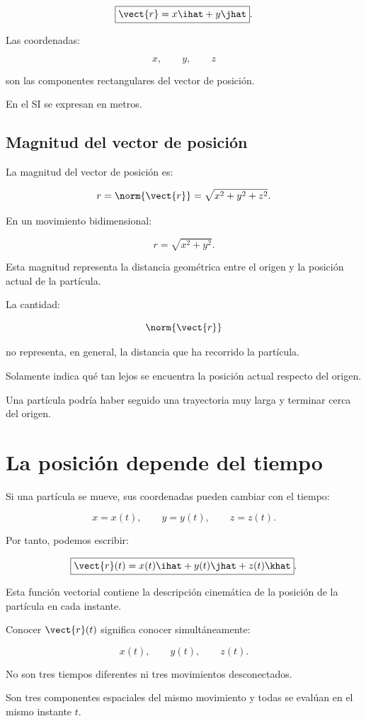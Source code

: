 \[
\boxed{
\vect{r}
=
x\ihat+y\jhat
}.
\]

Las coordenadas:

\[
x,\qquad y,\qquad z
\]

son las componentes rectangulares del vector de posición.

En el SI se expresan en metros.

\subsection{Magnitud del vector de posición}

La magnitud del vector de posición es:

\[
r
=
\norm{\vect{r}}
=
\sqrt{x^2+y^2+z^2}.
\]

En un movimiento bidimensional:

\[
r=\sqrt{x^2+y^2}.
\]

Esta magnitud representa la distancia geométrica entre el origen y la posición
actual de la partícula.

\begin{errorfrecuente}
La cantidad:

\[
\norm{\vect{r}}
\]

no representa, en general, la distancia que ha recorrido la partícula.

Solamente indica qué tan lejos se encuentra la posición actual respecto del
origen.

Una partícula podría haber seguido una trayectoria muy larga y terminar cerca
del origen.
\end{errorfrecuente}


\section{La posición depende del tiempo}

Si una partícula se mueve, sus coordenadas pueden cambiar con el tiempo:

\[
x=x(t),
\qquad
y=y(t),
\qquad
z=z(t).
\]

Por tanto, podemos escribir:

\[
\boxed{
\vect{r}(t)
=
x(t)\ihat+y(t)\jhat+z(t)\khat
}.
\]

Esta función vectorial contiene la descripción cinemática de la posición de la
partícula en cada instante.

\begin{interpretacion}
Conocer \(\vect{r}(t)\) significa conocer simultáneamente:

\[
x(t),\qquad y(t),\qquad z(t).
\]

No son tres tiempos diferentes ni tres movimientos desconectados.

Son tres componentes espaciales del mismo movimiento y todas se evalúan en el
mismo instante \(t\).
\end{interpretacion}


